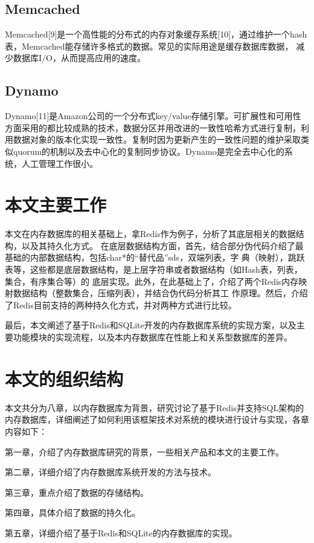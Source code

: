\documentclass{zjutthesis}
\begin{document}
\subsection{Memcached}
Memcached[9]是一个高性能的分布式的内存对象缓存系统[10]，通过维护一个hash表，Memcached能存储许多格式的数据。常见的实际用途是缓存数据库数据，
减少数据库I/O，从而提高应用的速度。

\subsection{Dynamo}
Dynamo[11]是Amazon公司的一个分布式key/value存储引擎。可扩展性和可用性方面采用的都比较成熟的技术，数据分区并用改进的一致性哈希方式进行复制，利用数据对象的版本化实现一致性。复制时因为更新产生的一致性问题的维护采取类似quorum的机制以及去中心化的复制同步协议。Dynamo是完全去中心化的系统，人工管理工作很小。

\section{本文主要工作}
本文在内存数据库的相关基础上，拿Redis作为例子，分析了其底层相关的数据结构，以及其持久化方式。
在底层数据结构方面，首先，结合部分伪代码介绍了最基础的内部数据结构，包括char*的“替代品”sds，双端列表，字
典（映射），跳跃表等，这些都是底层数据结构，是上层字符串或者数据结构（如Hash表，列表，集合，有序集合等）的
底层实现。此外，在此基础上了，介绍了两个Redis内存映射数据结构（整数集合，压缩列表），并结合伪代码分析其工
作原理。然后，介绍了Redis目前支持的两种持久化方式，并对两种方式进行比较。

最后，本文阐述了基于Redis和SQLite开发的内存数据库系统的实现方案，以及主要功能模块的实现流程，以及本内存数据库在性能上和关系型数据库的差异。

\section{本文的组织结构}
本文共分为八章，以内存数据库为背景，研究讨论了基于Redis并支持SQL架构的内存数据库，详细阐述了如何利用该框架技术对系统的模块进行设计与实现，各章内容如下：

第一章，介绍了内存数据库研究的背景，一些相关产品和本文的主要工作。

第二章，详细介绍了内存数据库系统开发的方法与技术。

第三章，重点介绍了数据的存储结构。

第四章，具体介绍了数据的持久化。

第五章，详细介绍了基于Redis和SQLite的内存数据库的实现。
\end{document}
